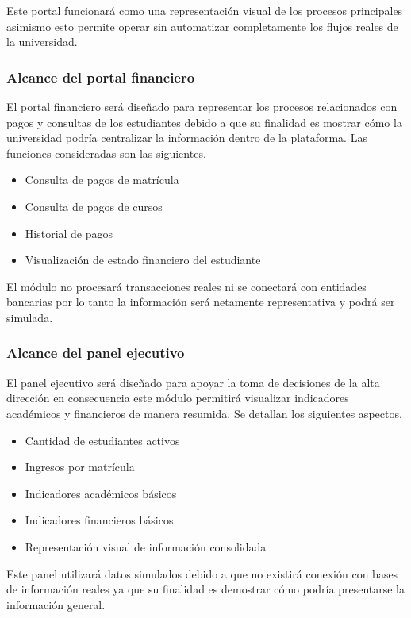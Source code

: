 \documentclass[11pt,spanish]{article}
\begin{document}
Este portal funcionará como una representación visual de los procesos principales asimismo esto permite operar sin automatizar completamente los flujos reales de la universidad.

\subsubsection{Alcance del portal financiero}

El portal financiero será diseñado para representar los procesos relacionados con pagos y consultas de los estudiantes debido a que su finalidad es mostrar cómo la universidad podría centralizar la información dentro de la plataforma. Las funciones consideradas son las siguientes.

\begin{itemize}
    \item Consulta de pagos de matrícula
    \item Consulta de pagos de cursos
    \item Historial de pagos
    \item Visualización de estado financiero del estudiante
\end{itemize}

El módulo no procesará transacciones reales ni se conectará con entidades bancarias por lo tanto la información será netamente representativa y podrá ser simulada.

\subsubsection{Alcance del panel ejecutivo}

El panel ejecutivo será diseñado para apoyar la toma de decisiones de la alta dirección en consecuencia este módulo permitirá visualizar indicadores académicos y financieros de manera resumida. Se detallan los siguientes aspectos.

\begin{itemize}
    \item Cantidad de estudiantes activos
    \item Ingresos por matrícula
    \item Indicadores académicos básicos
    \item Indicadores financieros básicos
    \item Representación visual de información consolidada
\end{itemize}

Este panel utilizará datos simulados debido a que no existirá conexión con bases de información reales ya que su finalidad es demostrar cómo podría presentarse la información general.
\end{document}

